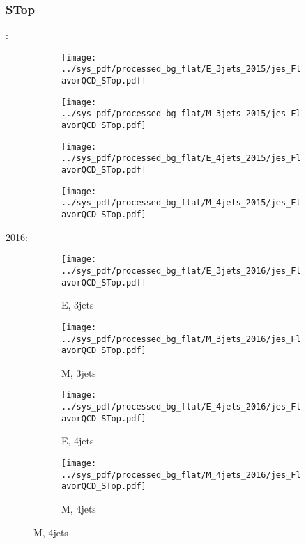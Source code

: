 \documentclass{beamer}
\begin{document}
\begin{frame}
\frametitle{STop}
\fontsize{5}{1}:
\begin{figure}
\centering
\begin{subfigure}[b]{0.24\textwidth}
\texttt{[image: ../sys\_pdf/processed\_bg\_flat/E\_3jets\_2015/jes\_FlavorQCD\_STop.pdf]}
\end{subfigure}
\begin{subfigure}[b]{0.24\textwidth}
\texttt{[image: ../sys\_pdf/processed\_bg\_flat/M\_3jets\_2015/jes\_FlavorQCD\_STop.pdf]}
\end{subfigure}
\begin{subfigure}[b]{0.24\textwidth}
\texttt{[image: ../sys\_pdf/processed\_bg\_flat/E\_4jets\_2015/jes\_FlavorQCD\_STop.pdf]}
\end{subfigure}
\begin{subfigure}[b]{0.24\textwidth}
\texttt{[image: ../sys\_pdf/processed\_bg\_flat/M\_4jets\_2015/jes\_FlavorQCD\_STop.pdf]}
\end{subfigure}
\end{figure}
2016:
\begin{figure}
\centering
\begin{subfigure}[b]{0.24\textwidth}
\texttt{[image: ../sys\_pdf/processed\_bg\_flat/E\_3jets\_2016/jes\_FlavorQCD\_STop.pdf]}
\captionsetup{font=tiny}
\caption{E, 3jets}
\end{subfigure}
\begin{subfigure}[b]{0.24\textwidth}
\texttt{[image: ../sys\_pdf/processed\_bg\_flat/M\_3jets\_2016/jes\_FlavorQCD\_STop.pdf]}
\captionsetup{font=tiny}
\caption{M, 3jets}
\end{subfigure}
\begin{subfigure}[b]{0.24\textwidth}
\texttt{[image: ../sys\_pdf/processed\_bg\_flat/E\_4jets\_2016/jes\_FlavorQCD\_STop.pdf]}
\captionsetup{font=tiny}
\caption{E, 4jets}
\end{subfigure}
\begin{subfigure}[b]{0.24\textwidth}
\texttt{[image: ../sys\_pdf/processed\_bg\_flat/M\_4jets\_2016/jes\_FlavorQCD\_STop.pdf]}
\captionsetup{font=tiny}
\caption{M, 4jets}
\end{subfigure}
\end{figure}
\end{frame}
\end{document}
